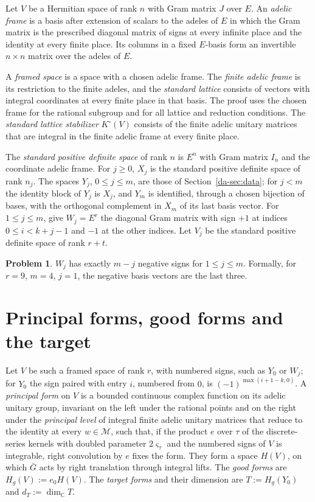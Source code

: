 \documentclass[reqno]{amsart}
\theoremstyle{plain}
\theoremstyle{definition}
\newtheorem{problem}{Problem}[section]
\newcommand{\C}{{\mathbb{C}}}
\begin{document}
Let \(V\) be a Hermitian space of rank \(n\) with Gram matrix \(J\) over \(E\).  An \emph{adelic frame} is a basis after extension of scalars to the adeles of \(E\) in which the Gram matrix is the prescribed diagonal matrix of signs at every infinite place and the identity at every finite place.  Its columns in a fixed \(E\)-basis form an invertible \(n\times n\) matrix over the adeles of \(E\).

A \emph{framed space} is a space with a chosen adelic frame.  The \emph{finite adelic frame} is its restriction to the finite adeles, and the \emph{standard lattice} consists of vectors with integral coordinates at every finite place in that basis.  The proof uses the chosen frame for the rational subgroup and for all lattice and reduction conditions.  The \emph{standard lattice stabilizer} \(K^\circ(V)\) consists of the finite adelic unitary matrices that are integral in the finite adelic frame at every finite place.

The \emph{standard positive definite space} of rank \(n\) is \(E^n\) with Gram matrix \(I_n\) and the coordinate adelic frame.  For \(j \ge 0\), \(X_j\) is the standard positive definite space of rank \(n_j\).  The spaces \(Y_j\), \(0 \le j \le m\), are those of Section~\ref{da-sec:data}; for \(j < m\) the identity block of \(Y_j\) is \(X_j\), and \(Y_m\) is identified, through a chosen bijection of bases, with the orthogonal complement in \(X_m\) of its last basis vector.  For \(1 \le j \le m\), give \(W_j = E^r\) the diagonal Gram matrix with sign \(+1\) at indices \(0 \le i < k+j-1\) and \(-1\) at the other indices.  Let \(V_j\) be the standard positive definite space of rank \(r + t\).

\begin{problem}\label{pr:signs-W}
\(W_j\) has exactly \(m - j\) negative signs for \(1 \le j \le m\).  Formally, for \(r = 9\), \(m = 4\), \(j = 1\), the negative basis vectors are the last three.
\end{problem}

\section{Principal forms, good forms and the target}\label{sec:forms}

Let \(V\) be such a framed space of rank \(r\), with numbered signs, such as \(Y_0\) or \(W_j\); for \(Y_0\) the sign paired with entry \(i\), numbered from \(0\), is \((-1)^{\max(i+1-k,0)}\).  A \emph{principal form} on \(V\) is a bounded continuous complex function on its adelic unitary group, invariant on the left under the rational points and on the right under the \emph{principal level} of integral finite adelic unitary matrices that reduce to the identity at every \(w\in\mathcal M\), such that, if the product \(e\) over \(\tau\) of the discrete-series kernels with doubled parameter \(2\varsigma_\tau\) and the numbered signs of \(V\) is integrable, right convolution by \(e\) fixes the form.  They form a space \(H(V)\), on which \(\bar G\) acts by right translation through integral lifts.  The \emph{good forms} are \(H_g(V) := e_0 H(V)\).  The \emph{target forms} and their dimension are \(T := H_g(Y_0)\) and \(d_T := \dim_\C T\).
\end{document}
